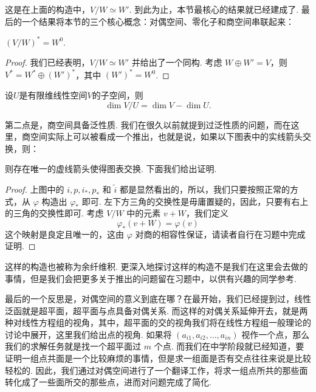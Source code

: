 这是在上面的构造中，$V/W \simeq W'$. 到此为止，本节最核心的结果就已经建成了. 最后的一个结果将本节的三个核心概念：对偶空间、零化子和商空间串联起来：

\begin{theorem}{}{}
    $(V/W)^* = W^0$.
\end{theorem}

\begin{proof}
    我们已经表明，$V/W \simeq W'$ 并给出了一个同构. 考虑 $W \oplus W' = V$，则 $V^* = W^* \oplus (W')^*$，其中 $(W')^* = W^0$.
\end{proof}

\begin{corollary}{}{}
    设$U$是有限维线性空间$V$的子空间，则
    \[\dim V/U=\dim V-\dim U.\]
\end{corollary}

第二点是，商空间具备泛性质. 我们在很久以前就提到过泛性质的问题，而在这里，商空间实际上可以被看成一个推出，也就是说，如果以下图表中的实线箭头交换，则：

\begin{center}
\end{center}

则存在唯一的虚线箭头使得图表交换. 下面我们给出证明.

\begin{proof}
    上图中的 $i, p, i_*, p_*$ 和 $\tilde{i}$ 都是显然看出的，所以，我们只要按照正常的方式，从 $\varphi$ 构造出 $\varphi_*$ 即可. 左下方三角的交换性是毋庸置疑的，因此，只要有右上的三角的交换性即可. 考虑 $V/W$ 中的元素 $v + W$，我们定义
    \[ \varphi_*(v + W) = \varphi(v) \]
    这个映射是良定且唯一的，这由 $\varphi$ 对商的相容性保证，请读者自行在习题中完成证明.
\end{proof}

这样的构造也被称为余纤维积. 更深入地探讨这样的构造不是我们在这里会去做的事情，但是我们会把更多关于推出的问题留在习题中，以供有兴趣的同学参考.

最后的一个反思是，对偶空间的意义到底在哪？在最开始，我们已经提到过，线性泛函就是超平面，超平面与点具备对偶关系. 而这样的对偶关系延伸开去，就是两种对线性方程组的视角，其中，超平面的交的视角我们将在线性方程组一般理论的讨论中展开，这里我们给出点的视角. 如果将 $(a_{i1}, a_{i2},\ldots, a_{in})$ 视作一个点，那么我们的求解任务就是找一个超平面过 $m$ 个点. 而我们在中学阶段就已经知道，要证明一组点共面是一个比较麻烦的事情，但是求一组面是否有交点往往来说是比较轻松的. 因此，我们通过对偶空间进行了一个翻译工作，将求一组点所共的那些面转化成了一些面所交的那些点，进而对问题完成了简化.

